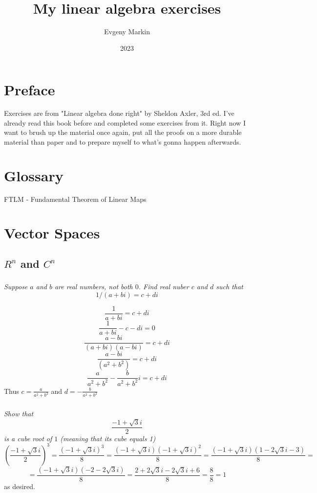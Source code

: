 \documentclass[11pt,oneside,titlepage]{book}
\title{My linear algebra exercises}
\author{Evgeny Markin}
\date{2023}
\begin{document}
\maketitle
\tableofcontents

\chapter*{Preface}

Exercises are from "Linear algebra done right" by Sheldon Axler, 3rd ed.
I've already read this book before and completed some exercises from it.
Right now I want to brush up the material once again, put all the
proofs on a more durable material than paper and to prepare myself to
what's gonna happen afterwards.

\chapter*{Glossary}

FTLM - Fundamental Theorem of Linear Maps 

\chapter{Vector Spaces}
\section{$R^n$ and $C^n$}

\subsection{}
\textit{Suppose $a$ and $b$ are real numbers, not both $0$. Find real nuber
  $c$ and $d$ such that }
$$1/(a + bi) = c + di$$

$$\frac{1}{a + bi} = c + di$$
$$\frac{1}{a + bi} - c - di = 0$$
$$\frac{a - bi}{(a + bi)(a - bi)} = c + di$$
$$\frac{a - bi}{(a^2 + b^2)} = c + di$$
$$\frac{a}{a^2 + b^2} - \frac{b}{a^2 + b^2}i = c + di$$
Thus $c = \frac{a}{a^2 + b^2}$ and $d = -\frac{b}{a^2 + b^2}$

\subsection{}
\textit{Show that }
$$\frac{-1  + \sqrt{3}i}{2}$$
\textit{is a cube root of $1$ (meaning that its cube equals 1)}
$$(\frac{-1  + \sqrt{3}i}{2})^3 =
\frac{(-1  + \sqrt{3}i)^3}{8} =
\frac{(-1  + \sqrt{3}i)(-1  + \sqrt{3}i)^2}{8} =
\frac{(-1  + \sqrt{3}i)(1  - 2\sqrt{3}i - 3)}{8} =
$$
$$
=\frac{(-1  + \sqrt{3}i)(-2  - 2\sqrt{3}i)}{8} =
\frac{2 + 2\sqrt{3}i - 2\sqrt{3}i + 6}{8} =
\frac{8}{8} = 1
$$
as desired.
\end{document}
